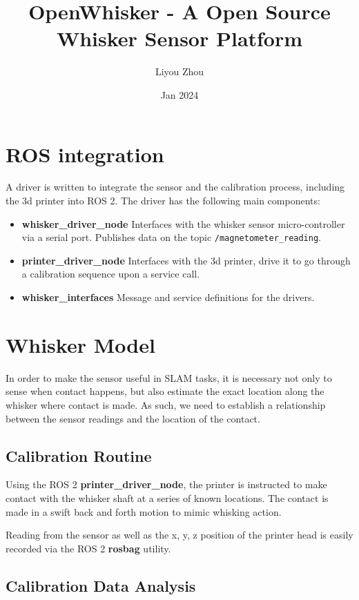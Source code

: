\documentclass{article}
\title{OpenWhisker - A Open Source Whisker Sensor Platform}
\author{Liyou Zhou}
\date{Jan 2024}
\begin{document}
\maketitle

\section{ROS integration}

A driver is written to integrate the sensor and the calibration process, including the 3d printer into ROS 2.
The driver has the following main components:

\begin{itemize}
    \item \textbf{whisker\_driver\_node} Interfaces with the whisker sensor micro-controller via a serial port.
Publishes data on the topic \verb|/magnetometer_reading|.
    \item  \textbf{printer\_driver\_node} Interfaces with the 3d printer, drive it to go through a calibration sequence
upon a service call.
    \item \textbf{whisker\_interfaces} Message and service definitions for the drivers.
\end{itemize}

\section{Whisker Model}

In order to make the sensor useful in SLAM tasks, it is necessary not  only to sense when contact happens, but also estimate the exact location along the whisker where contact is made. As such, we need to establish a relationship between the sensor readings and the location of the contact.

\subsection{Calibration Routine}

Using the ROS 2 \textbf{printer\_driver\_node}, the printer is instructed to make contact with the whisker shaft at a series of known locations. The contact is made in a swift back and forth motion to mimic whisking action.

Reading from the sensor as well as the x, y, z position of the printer head is easily recorded via the ROS 2 \textbf{rosbag} utility.

\subsection{Calibration Data Analysis}
\end{document}
